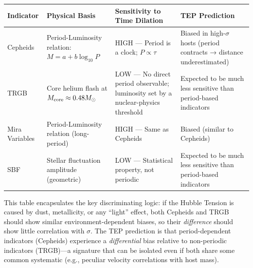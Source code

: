 \documentclass[
]{article}
\newcounter{none} %
\begin{document}
{\def\LTcaptype{none} %
\begin{longtable}[]{@{}
  >{\raggedright\arraybackslash}p{}
  >{\raggedright\arraybackslash}p{}
  >{\raggedright\arraybackslash}p{}
  >{\raggedright\arraybackslash}p{}@{}}
\toprule\noalign{}
\begin{minipage}[b]{\linewidth}\raggedright
Indicator
\end{minipage} & \begin{minipage}[b]{\linewidth}\raggedright
Physical Basis
\end{minipage} & \begin{minipage}[b]{\linewidth}\raggedright
Sensitivity to Time Dilation
\end{minipage} & \begin{minipage}[b]{\linewidth}\raggedright
TEP Prediction
\end{minipage} \\
\midrule\noalign{}
\endhead
\bottomrule\noalign{}
\endlastfoot
Cepheids & Period-Luminosity relation: \(M = a + b\log_{10} P\) & HIGH
--- Period is a clock; \(P \propto \tau\) & Biased in high-\(\sigma\)
hosts (period contracts → distance underestimated) \\
TRGB & Core helium flash at \(M_{\rm core} \approx 0.48 M_\odot\) & LOW
--- No direct period observable; luminosity set by a nuclear-physics
threshold & Expected to be much less sensitive than period-based
indicators \\
Mira Variables & Period-Luminosity relation (long-period) & HIGH ---
Same as Cepheids & Biased (similar to Cepheids) \\
SBF & Stellar fluctuation amplitude (geometric) & LOW --- Statistical
property, not periodic & Expected to be much less sensitive than
period-based indicators \\
\end{longtable}
}

This table encapsulates the key discriminating logic: if the Hubble
Tension is caused by dust, metallicity, or any ``light'' effect, both
Cepheids and TRGB should show similar environment-dependent biases, so
their \emph{difference} should show little correlation with \(\sigma\).
The TEP prediction is that period-dependent indicators (Cepheids)
experience a \emph{differential} bias relative to non-periodic
indicators (TRGB)---a signature that can be isolated even if both share
some common systematic (e.g., peculiar velocity correlations with host
mass).
\end{document}
